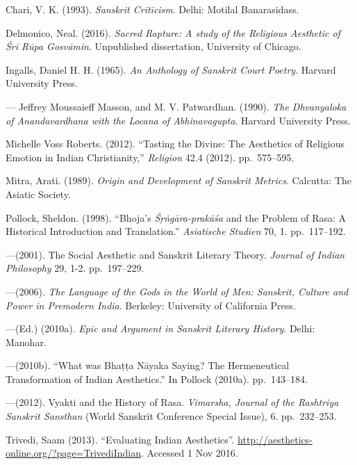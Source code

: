\begin{thebibliography}{99}
\itemsep=2pt
Chari, V. K. (1993). \textsl{Sanskrit Criticism}. Delhi: Motilal Banarasidass.

Delmonico, Neal. (2016). \textsl{Sacred Rapture: A study of the Religious Aesthetic of Śrī Rūpa Gosvāmin}. Unpublished dissertation, University of Chicago.

Ingalls, Daniel H. H. (1965). \textsl{An Anthology of Sanskrit Court Poetry}. Harvard University Press.

---\kern3pt Jeffrey Moussaieff Masson, and M. V. Patwardhan. (1990). \textsl{The Dhvanyaloka of Anandavardhana with the Locana of Abhinavagupta}. Harvard University Press.

Michelle Voss Roberts. (2012). ``Tasting the Divine: The Aesthetics of Religious Emotion in Indian Christianity,'' \textsl{Religion} 42.4 (2012). pp.~575--595.

Mitra, Arati. (1989). \textsl{Origin and Development of Sanskrit Metrics}. Calcutta: The Asiatic Society.

Pollock, Sheldon. (1998). ``Bhoja's \textsl{Śṛṅgāra-prakāśa} and the Problem of Rasa: A Historical Introduction and Translation.'' \textsl{Asiatische Studien} 70, 1. pp.~117--192. 

---\kern3pt(2001). The Social Aesthetic and Sanskrit Literary Theory. \textsl{Journal of Indian Philosophy} 29, 1-2. pp.~197--229.

---\kern3pt(2006). \textsl{The Language of the Gods in the World of Men: Sanskrit, Culture and Power in Premodern India}. Berkeley: University of California Press.

---\kern3pt(Ed.) (2010a). \textsl{Epic and Argument in Sanskrit Literary History}. Delhi: Manohar.

---\kern3pt(2010b). ``What was Bhaṭṭa Nāyaka Saying? The Hermeneutical Transformation of Indian Aesthetics.'' In Pollock (2010a). pp.~143--184.

---\kern3pt(2012). Vyakti and the History of Rasa. \textsl{Vimarsha, Journal of the Rashtriya Sanskrit Sansthan} (World Sanskrit Conference Special Issue), 6. pp.~232--253.

Trivedi, Saam (2013). ``Evaluating Indian Aesthetics''. \url{http://aesthetics-online.org/?page=TrivediIndian}. Accessed 1 Nov 2016.
\label{chapter\thechapter:end}
\end{thebibliography}
